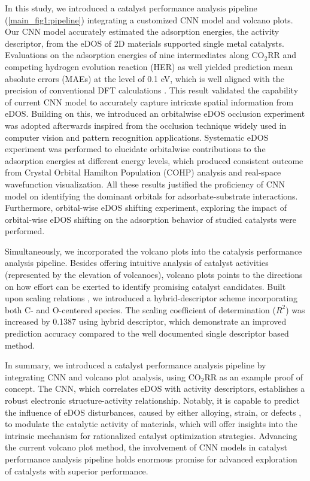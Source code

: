 In this study, we introduced a catalyst performance analysis pipeline (\cref{main_fig1:pipeline}) integrating a customized CNN model and volcano plots.
Our CNN model accurately estimated the adsorption energies, the activity descriptor, from the eDOS of 2D materials supported single metal catalysts.
Evaluations on the adsorption energies of nine intermediates along CO$_2$RR and competing hydrogen evolution reaction (HER) as well yielded prediction mean absolute errors (MAEs) at the level of 0.1 eV, which is well aligned with the precision of conventional DFT calculations \cite{kirklin2015open, lejaeghere2016reproducibility, wellendorff2015benchmark}.
This result validated the capability of current CNN model to accurately capture intricate spatial information from eDOS.
Building on this, we introduced an orbitalwise eDOS occlusion experiment was adopted afterwards inspired from the occlusion technique widely used in computer vision and pattern recognition applications.
Systematic eDOS experiment was performed to elucidate orbitalwise contributions to the adsorption energies at different energy levels, which produced consistent outcome from Crystal Orbital Hamilton Population (COHP) analysis and real-space wavefunction visualization.
All these results justified the proficiency of CNN model on identifying the dominant orbitals for adsorbate-substrate interactions.
Furthermore, orbital-wise eDOS shifting experiment, exploring the impact of orbital-wise eDOS shifting on the adsorption behavior of studied catalysts were performed.

Simultaneously, we incorporated the volcano plots into the catalysis performance analysis pipeline.
Besides offering intuitive analysis of catalyst activities (represented by the elevation of volcanoes), volcano plots points to the directions on how effort can be exerted to identify promising catalyst candidates.
Built upon scaling relations \cite{peterson2012activity}, we introduced a hybrid-descriptor scheme incorporating both C- and O-centered species.
The scaling coefficient of determination ($R^2$) was increased by 0.1387 using hybrid descriptor, which demonstrate an improved prediction accuracy compared to the well documented single descriptor based method.

In summary, we introduced a catalyst performance analysis pipeline by integrating CNN and volcano plot analysis, using CO$_2$RR as an example proof of concept.
The CNN, which correlates eDOS with activity descriptors, establishes a robust electronic structure-activity relationship.
Notably, it is capable to predict the influence of eDOS disturbances, caused by either alloying, strain, or defects \cite{norskov2011density, bera2017density, kusada2019emergence}, to modulate the catalytic activity of materials, which will offer insights into the intrinsic mechanism for rationalized catalyst optimization strategies.
Advancing the current volcano plot method, the involvement of CNN models in catalyst performance analysis pipeline holds enormous promise for advanced exploration of catalysts with superior performance.
